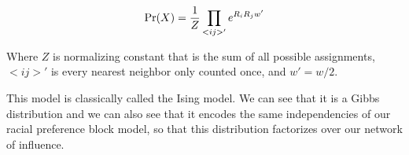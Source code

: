 \documentclass{article}
\begin{document}
\begin{equation}
\Pr(X) = \frac{1}{Z}\prod_{<i j>'}e^{R_iR_jw'} \\
\end{equation}

Where $Z$ is normalizing constant that is the sum of all possible assignments, 
$<i j>'$ is every nearest neighbor only counted once, and $w' = w/2$.

This model is classically called the Ising model. We can see that it
is a Gibbs distribution and we can also see that it encodes the same
independencies of our racial preference block model, so that this distribution
factorizes over our  network of influence. 
\end{document}
